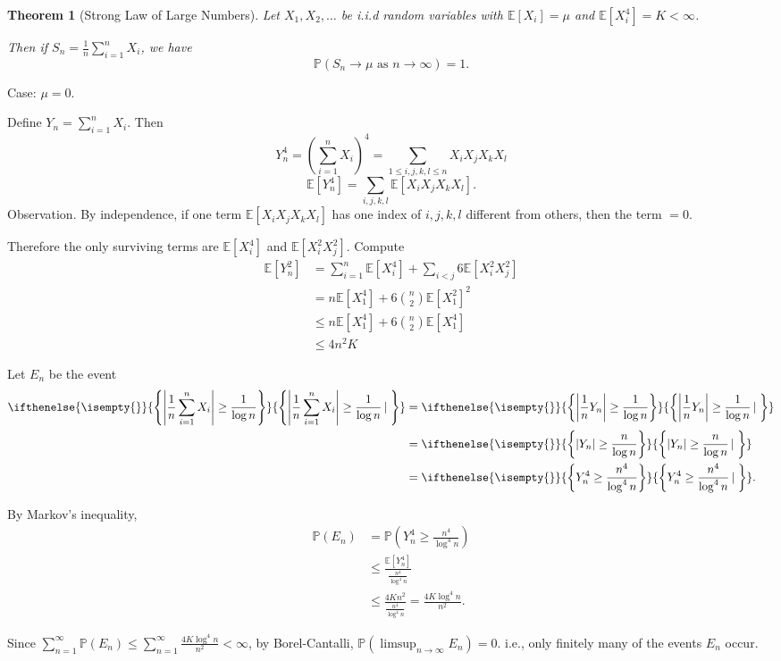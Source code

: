 \documentclass[a4paper,11pt]{amsbook}
\makeatletter
\renewenvironment{proof}[1][\proofname]{\par
    \pushQED{\qed}%
    \normalfont \topsep6\p@\@plus6\p@\relax
    \trivlist
    \itemindent\z@ %
    \item[\hskip\labelsep
          \scshape
      #1\@addpunct{.}]\ignorespaces
}{%
    \popQED\endtrivlist\@endpefalse
}
\newtheorem{theorem}{\hspace{-2em} \color{darkblue} Theorem}[chapter]
\theoremstyle{definition}
\theoremstyle{remark}
\newcommand{\E}{\mathbb{E}}
\renewcommand{\P}{\mathbb{P}}
\newcommand{\abs}[1]{\left|#1\right|}
\newcommand\0{\varnothing}
\newcommand\set[2][]
{
    \ifthenelse{\isempty{#1}}
    {
        \left\{#2\right\}
    }
    {
        \left\{#2\left|\,#1\right.\right\}
    }
}
\makeatother
\begin{document}
\begin{theorem}[Strong Law of Large Numbers]
    Let $X_1,X_2,\ldots$ be i.i.d random variables with $\E[X_i]=\mu$ and $\E[X_i^4]=K<\infty$.

    Then if $S_n=\frac{1}{n}\sum_{i=1}^nX_i$, we have
    $$\P(S_n\to\mu\text{ as }n\to\infty)=1.$$ %
\end{theorem}
\begin{proof}
    Case: $\mu=0$.

    Define $Y_n=\sum_{i=1}^{n}X_i$. Then $$Y_n^4=\left(\sum_{i=1}^{n}X_i\right)^4=\sum_{1\leq i,j,k,l\leq n}X_iX_jX_kX_l$$
    $$\E[Y_n^4]=\sum_{i,j,k,l}\E[X_iX_jX_kX_l].$$
    Observation. By independence, if one term $\E[X_iX_jX_kX_l]$ has one index of $i,j,k,l$ different from others, 
    then the term $=0$.

    Therefore the only surviving terms are $\E[X_i^4]$ and $\E[X_i^2X_j^2]$.
    Compute
    \begin{align*}
        \E[Y_n^2]&=\sum_{i=1}^{n}\E[X_i^4]+\sum_{i<j}6\E[X_i^2X_j^2] \\
        &=n\E[X_1^4]+6\binom{n}{2}\E[X_1^2]^2 \\
        &\leq n\E[X_1^4]+6\binom{n}{2}\E[X_1^4] \\
        &\leq 4n^2K
    \end{align*}

    Let $E_n$ be the event \begin{align*}
        \set{\abs{\frac{1}{n}\sum_{i=1}^{n}X_i}\geq\frac{1}{\log n}}
        &=\set{\abs{\frac{1}{n}Y_n}\geq\frac{1}{\log n}} \\
        &=\set{\abs{Y_n}\geq\frac{n}{\log n}} \\
        &=\set{Y_n^4\geq\frac{n^4}{\log^4 n}}.
    \end{align*}

    By Markov's inequality, \begin{align*}
        \P(E_n)&=\P\left(Y_n^4\geq\frac{n^4}{\log^4 n}\right) \\
        &\leq\frac{\E[Y_n^4]}{\frac{n^4}{\log^4 n}} \\
        &\leq\frac{4Kn^2}{\frac{n^4}{\log^4 n}}=\frac{4K\log^4 n}{n^2}.
    \end{align*}

    Since $\sum_{n=1}^\infty\P(E_n)\leq\sum_{n=1}^\infty\frac{4K\log^4 n}{n^2}<\infty$,
    by Borel-Cantalli, $\P\left(\limsup_{n\to\infty}E_n\right)=0$.
    i.e., only finitely many of the events $E_n$ occur.


\end{proof}
\end{document}
